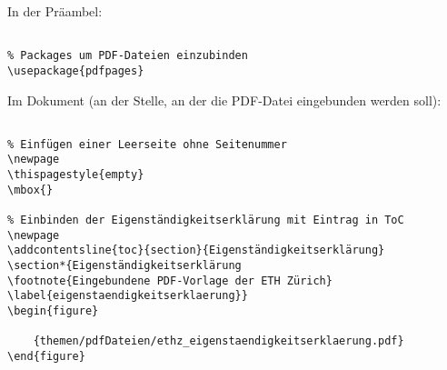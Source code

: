 
In der Präambel:

\begin{verbatim}

% Packages um PDF-Dateien einzubinden
\usepackage{pdfpages}

\end{verbatim}

\tcblower

Im Dokument (an der Stelle, an der die PDF-Datei eingebunden werden soll): 

\begin{verbatim}

% Einfügen einer Leerseite ohne Seitenummer
\newpage
\thispagestyle{empty}
\mbox{}

% Einbinden der Eigenständigkeitserklärung mit Eintrag in ToC
\newpage
\addcontentsline{toc}{section}{Eigenständigkeitserklärung}
\section*{Eigenständigkeitserklärung
\footnote{Eingebundene PDF-Vorlage der ETH Zürich} 
\label{eigenstaendigkeitserklaerung}}
\begin{figure}

    {themen/pdfDateien/ethz_eigenstaendigkeitserklaerung.pdf}
\end{figure}

\end{verbatim}

